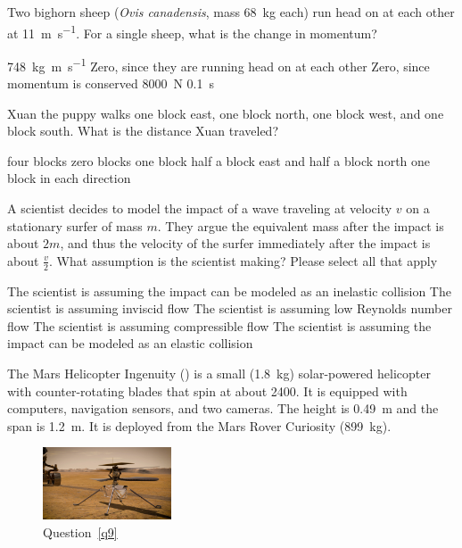 \documentclass[exam,addpoints, noanswers]{exam}
\begin{document}
\begin{questions}
\question[5] Two bighorn sheep (\emph{Ovis canadensis}, mass \SI{68}{\kilo\gram} each) run head on at each other at \SI{11}{\meter\per\second}. For a single sheep, what is the change in momentum? 
\begin{choices}
\CorrectChoice \SI{748}{\kilo\gram\meter\per\second}
\choice Zero, since they are running head on at each other
\choice Zero, since momentum is conserved
\choice \SI{8000}{\newton}
\choice \SI{0.1}{\second}
\end{choices}

\question[5] Xuan the puppy walks one block east, one block north, one block west, and one block south. What is the distance Xuan traveled? 
\begin{choices}
\CorrectChoice four blocks
\choice zero blocks
\choice one block
\choice half a block east and half a block north
\choice one block in each direction
\end{choices}

\question[5] A scientist decides to model the impact of a wave traveling at velocity $v$ on a stationary surfer of mass $m$. They argue the equivalent mass after the impact is about $2m$, and thus the velocity of the surfer immediately after the impact is about $\frac{v}{2}$. What assumption is the scientist making? Please select all that apply
\begin{choices}
\CorrectChoice The scientist is assuming the impact can be modeled as an inelastic collision
\CorrectChoice The scientist is assuming inviscid flow
\choice The scientist is assuming low Reynolds number flow
\choice The scientist is assuming compressible flow
\choice The scientist is assuming the impact can be modeled as an elastic collision
\end{choices}




\clearpage
\question\label{q9} The Mars Helicopter Ingenuity () is a small (\SI{1.8}{\kilo\gram}) solar-powered helicopter with counter-rotating blades that spin at about \SI{2400}{\rpm}. It is equipped with computers, navigation sensors, and two cameras. The height is \SI{0.49}{\meter} and the span is \SI{1.2}{\meter}. It is deployed from the Mars Rover Curiosity (\SI{899}{\kilo\gram}). 
\begin{figure}[h]
\begin{center}
\includegraphics[width=1.5in]{ingenuity.jpg}
\end{center}
\caption{Question~\ref{q9}}
\label{fig:q9}
\end{figure}
\begin{parts}

\end{parts}
\end{questions}
\end{document}
